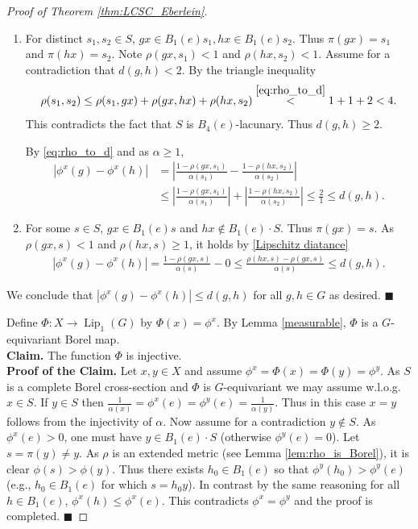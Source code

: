\documentclass[11pt]{article}
\theoremstyle{plain}
\theoremstyle{definition}
\DeclareMathOperator{\Lip}{Lip}
\numberwithin{figure}{section}
\begin{document}
\begin{proof}[Proof of Theorem \ref{thm:LCSC_Eberlein}]
\begin{enumerate}
      \item
      For  distinct $s_1,s_2\in S$, $gx\in B_1(e) s_1,hx\in B_1(e) s_2$. Thus $\pi(gx)=s_1$ and $\pi(hx)=s_2$.  Note  $\rho(gx,s_1)<1$ and $\rho(hx,s_2)<1$. Assume for a contradiction that $d(g,h)<2$. By the triangle inequality
      $$\rho(s_1,s_2)\leq \rho(s_1,gx)+\rho(gx,hx)+\rho(hx,s_2)\stackrel{\eqref{eq:rho_to_d}}{<}1+1+2<4.$$
      This contradicts the fact that $S$ is $B_{4}(e)$-lacunary. Thus $d(g,h)\geq 2$.
      
      
      By \eqref{eq:rho_to_d} and as $\alpha\geq 1$,
                 \begin{equation*}
\begin{split}
|\phi^x(g)-\phi^x(h)| 
&= \left|\frac{1-\rho(gx,s_1)}{\alpha(s_1)}-\frac{1-\rho(hx,s_2)}{\alpha(s_2)}\right| \\
&\leq \left|\tfrac{1-\rho(gx,s_1)}{\alpha(s_1)}\right|
     + \left|\tfrac{1-\rho(hx,s_2)}{\alpha(s_2)}\right|
     \leq \tfrac{2}{1}\leq d(g,h).
\end{split}
\end{equation*}

    
      
      \item
           For some $s\in S$, $gx\in B_1(e) s$ and $hx\notin B_1(e)\cdot S$. Thus $\pi(gx)=s$. As $\rho(gx,s)<1$ and $\rho(hx,s)\geq 1$, it holds by \eqref{Lipschitz diatance}
      \begin{equation*}
          \begin{split}
              |\phi^x(g)-\phi^x(h)|=\frac{1-\rho(gx,s)}{\alpha(s)}-0\leq\frac{\rho(hx,s)-\rho(gx,s)}{\alpha(s)}\leq d(g,h).
          \end{split}
      \end{equation*}
      \end{enumerate}
      We conclude that $|\phi^x(g)-\phi^x(h)|\leq d(g,h)$ for all $g,h\in G$ as desired. \hfill $\blacksquare$

    
      
      Define $\Phi:X\to\Lip_1(G)$ by $\Phi(x)=\phi^x$. By Lemma \ref{measurable}, $\Phi$ is a $G$-equivariant Borel map. \\
      \noindent
      \textbf{Claim.} The function $\Phi$ is injective.\\
      \textbf{Proof of the Claim.}  
     Let $x,y\in X$ and assume $\phi^x=\Phi(x)=\Phi(y)=\phi^y$.  As $S$ is a complete Borel cross-section and $\Phi$ is $G$-equivariant we may assume w.l.o.g.\ $x\in S$. If $y\in S$ then $\frac{1}{\alpha(x)}=\phi^x(e)=\phi^y(e)=\frac{1}{\alpha(y)}$. Thus in this case $x=y$ follows from  the injectivity of $\alpha$. Now assume for a contradiction $y\notin S$. As  $\phi^x(e)>0$, one must have $y\in B_1(e)\cdot S$ (otherwise $\phi^y(e)=0$). Let $s=\pi(y)\neq y$. As $\rho$ is an extended metric (see Lemma \ref{lem:rho_is_Borel}), it is clear $\phi(s)>\phi(y)$. Thus there exists $h_0\in B_1(e)$ so that $\phi^y(h_0)>\phi^y(e)$ (e.g., $h_0\in B_1(e)$ for which   $s=h_0y$). In contrast by the same reasoning for all  $h\in B_1(e)$, $\phi^x(h)\leq\phi^x(e)$. This contradicts $\phi^x=\phi^y$ and the proof is completed.      
      \hfill $\blacksquare$


\end{proof}
\end{document}

